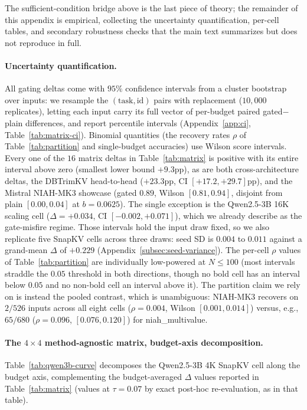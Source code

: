The sufficient-condition bridge above is the last piece of theory; the
remainder of this appendix is empirical, collecting the uncertainty
quantification, per-cell tables, and secondary robustness checks that
the main text summarizes but does not reproduce in full.

\paragraph{Uncertainty quantification.} All gating deltas come with $95\%$
confidence intervals from a cluster bootstrap over inputs: we resample the
$(\text{task}, \text{id})$ pairs with replacement ($10{,}000$ replicates),
letting each input carry its full vector of per-budget paired
gated$-$plain differences, and report percentile intervals
(Appendix~\ref{app:ci}, Table~\ref{tab:matrix-ci}). Binomial quantities (the
recovery rates $\rho$ of Table~\ref{tab:partition} and single-budget
accuracies) use Wilson score intervals. Every one of the $16$ matrix deltas
in Table~\ref{tab:matrix} is positive with its entire interval above zero
(smallest lower bound $+9.3$pp), as are both cross-architecture deltas, the
DBTrimKV head-to-head ($+23.3$pp, CI $[+17.2, +29.7]$pp), and the Mistral
NIAH-MK3 showcase (gated $0.89$, Wilson $[0.81, 0.94]$, disjoint from plain
$[0.00, 0.04]$ at $b = 0.0625$). The single exception is the Qwen2.5-3B 16K
scaling cell ($\Delta = +0.034$, CI $[-0.002, +0.071]$), which we already
describe as the gate-misfire regime. Those intervals hold the input draw fixed,
so we also replicate five SnapKV cells across three draws: seed SD is $0.004$ to
$0.011$ against a grand-mean $\Delta$ of $+0.229$
(Appendix~\ref{subsec:seed-variance}). The per-cell $\rho$ values of
Table~\ref{tab:partition} are individually low-powered at $N \le 100$ (most
intervals straddle the $0.05$ threshold in both directions, though no bold
cell has an interval below $0.05$ and no non-bold cell an interval above
it). The partition claim we rely on is instead the pooled contrast, which is
unambiguous: NIAH-MK3 recovers on $2/526$ inputs across all eight cells
($\rho = 0.004$, Wilson $[0.001, 0.014]$) versus, e.g., $65/680$
($\rho = 0.096$, $[0.076, 0.120]$) for niah\_multivalue.

\paragraph{The $4 \times 4$ method-agnostic matrix, budget-axis
decomposition.} Table~\ref{tab:qwen3b-curve} decomposes the Qwen2.5-3B 4K
SnapKV cell along the budget axis, complementing the budget-averaged
$\Delta$ values reported in Table~\ref{tab:matrix} (values at $\tau = 0.07$
by exact post-hoc re-evaluation, as in that table).


